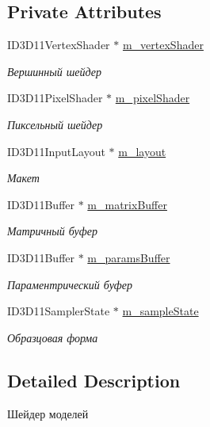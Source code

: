 \subsection*{Private Attributes}
\begin{DoxyCompactItemize}
\item 
I\+D3\+D11\+Vertex\+Shader $\ast$ \hyperlink{class_model_shader_class_a777f211c55c31fee5facf4b579856de3}{m\+\_\+vertex\+Shader}
\begin{DoxyCompactList}\small\item\em Вершинный шейдер \end{DoxyCompactList}\item 
I\+D3\+D11\+Pixel\+Shader $\ast$ \hyperlink{class_model_shader_class_a98386d05b75e06bcc4671f16d413d2a4}{m\+\_\+pixel\+Shader}
\begin{DoxyCompactList}\small\item\em Пиксельный шейдер \end{DoxyCompactList}\item 
I\+D3\+D11\+Input\+Layout $\ast$ \hyperlink{class_model_shader_class_a6a8a3d9e47108b1e3953a5b981d15b66}{m\+\_\+layout}
\begin{DoxyCompactList}\small\item\em Макет \end{DoxyCompactList}\item 
I\+D3\+D11\+Buffer $\ast$ \hyperlink{class_model_shader_class_a0ea5fc7202be41bb166cac94653e0b9f}{m\+\_\+matrix\+Buffer}
\begin{DoxyCompactList}\small\item\em Матричный буфер \end{DoxyCompactList}\item 
I\+D3\+D11\+Buffer $\ast$ \hyperlink{class_model_shader_class_a86d885b139c1675798d1e61372f30daa}{m\+\_\+params\+Buffer}
\begin{DoxyCompactList}\small\item\em Параментрический буфер \end{DoxyCompactList}\item 
I\+D3\+D11\+Sampler\+State $\ast$ \hyperlink{class_model_shader_class_a6b6ed136ba9c1252d21bcac7100f431b}{m\+\_\+sample\+State}
\begin{DoxyCompactList}\small\item\em Образцовая форма \end{DoxyCompactList}\end{DoxyCompactItemize}


\subsection{Detailed Description}
Шейдер моделей 

